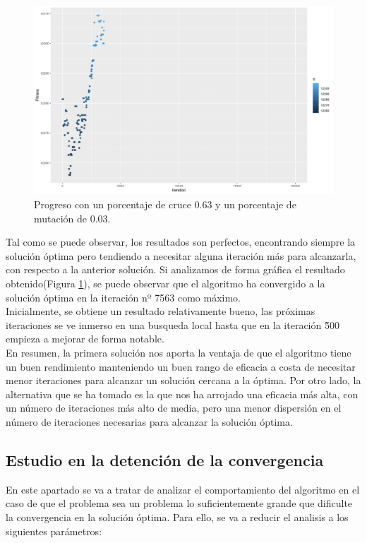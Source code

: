 \documentclass[runningheads]{llncs}
\begin{document}
\begin{figure}
	\centering
	\includegraphics[width=1.0\textwidth]{graphic_optimal}
	\caption{Progreso con un porcentaje de cruce 0.63 y un porcentaje de mutación de 0.03.}
	\label{fig:results_opt_crossover_0.77_mut_0.3}
\end{figure}

\noindent
Tal como se puede observar, los resultados son perfectos, encontrando siempre la solución óptima pero tendiendo a necesitar
alguna iteración más para alcanzarla, con respecto a la anterior solución. Si analizamos de forma gráfica el resultado obtenido(Figura \ref{fig:results_opt_crossover_0.77_mut_0.3}),
se puede observar que el algoritmo ha convergido a la solución óptima en la iteración nº 7563 como máximo.\\
Inicialmente, se obtiene un resultado relativamente bueno, las próximas iteraciones se ve inmerso en una busqueda local hasta que en la iteración \~500 empieza a mejorar de forma notable.\\
En resumen, la primera solución nos aporta la ventaja de que el algoritmo tiene un buen rendimiento manteniendo un buen rango de eficacia
a costa de necesitar menor iteraciones para alcanzar un solución cercana a la óptima. Por otro lado,
la alternativa que se ha tomado es la que nos ha arrojado una eficacia
más alta, con un número de iteraciones más alto de media, pero una menor dispersión en el número de iteraciones necesarias para alcanzar la solución óptima.


\subsection{Estudio en la detención de la convergencia}
En este apartado se va a tratar de analizar el comportamiento del algoritmo en el caso de que el problema sea un problema lo suficientemente
grande que dificulte la convergencia en la solución óptima. Para ello, se va a reducir el analisis a los siguientes parámetros:
\end{document}
